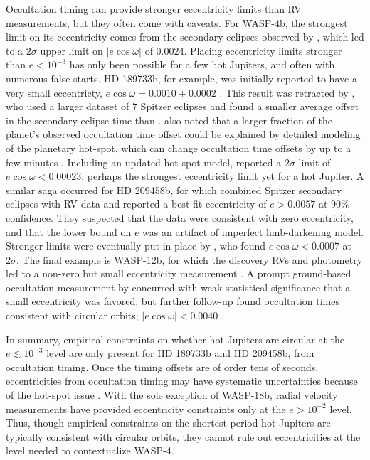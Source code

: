 \documentclass[12pt,twocolumn,tighten]{aastex62}
\begin{document}
Occultation timing can provide stronger eccentricity limits than
RV measurements, but they often come with caveats.
For WASP-4b, the strongest limit on its eccentricity comes from the
secondary eclipses observed by \citet{beerer_secondary_2011}, which
led to a $2\sigma$ upper limit on $| e\cos\omega | $ of 0.0024.
Placing eccentricity limits stronger than $e< 10^{-3}$
has only been possible for a few hot Jupiters, and often with numerous
false-starts.  HD 189733b, for example, was initially reported to have
a very small eccentricty, $e\cos\omega = 0.0010 \pm 0.0002$
\citep{knutson_map_2007}.  This result was retracted by
\citet{agol_climate_2010}, who used a larger dataset of 7 Spitzer
eclipses and found a smaller average offset in the secondary eclipse
time than \citet{knutson_map_2007}.  \citet{agol_climate_2010} also
noted that a larger fraction of the planet's observed occultation time
offset could be explained by detailed modeling of the planetary
hot-spot, which can change occultation time offsets by up to a few
minutes \citep{williams_resolving_2006}.  Including an updated
hot-spot model, \citet{agol_climate_2010} reported a 2$\sigma$ limit
of $e\cos\omega < 0.00023$, perhaps the strongest eccentricity limit
yet for a hot Jupiter.  A similar saga occurred for HD 209458b, for which
\citet{winn_measurement_2005} combined Spitzer secondary eclipses with
RV data and reported a best-fit eccentricity of $e>0.0057$ at 90\%
confidence.  They suspected that the data were consistent with zero
eccentricity, and that the lower bound on $e$ was an artifact of
imperfect limb-darkening model.  Stronger limits were eventually put
in place by \citet{crossfield_spitzer_mips_2012}, who found
$e\cos\omega < 0.0007$ at $2\sigma$.  The final example is WASP-12b,
for which the discovery RVs and photometry led to a non-zero but small
eccentricity measurement \citep[][at $3\sigma$]{hebb_wasp-12b_2009}.
A prompt ground-based occultation measurement by
\citet{lopez-morales_day-side_2010} concurred with weak statistical
significance that a small eccentricity was favored, but
further follow-up found occultation times consistent with circular
orbits; $| e\cos\omega| < 0.0040 $
\citep{campo_orbit_2011,croll_near-infrared_2011}.

In summary, empirical constraints on whether hot Jupiters are
circular at the $e \lesssim 10^{-3}$ level are only present for HD
189733b and HD 209458b, from occultation timing.  Once the timing
offsets are of order tens of seconds, eccentricities from occultation
timing may have systematic uncertainties because of the hot-spot issue
\citep{williams_resolving_2006,agol_climate_2010}.  With the sole
exception of WASP-18b, radial velocity measurements have provided
eccentricity constraints only at the $e > 10^{-2}$ level.  Thus,
though empirical constraints on the shortest period hot Jupiters are
typically consistent with circular orbits, they cannot rule out
eccentricities at the level needed to contextualize WASP-4.
\end{document}
